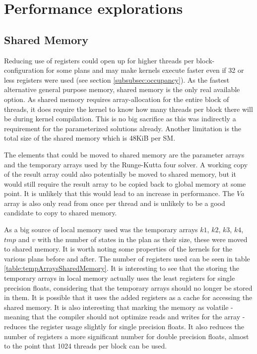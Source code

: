 \section{Performance explorations}
\subsection{Shared Memory}\label{subsec:sharedmem}
Reducing use of registers could open up for higher threads per block-configuration for some plans and may make kernels execute faster even if 32 or less registers were used (see section \ref{subsubsec:occupancy}).
As the fastest alternative general purpose memory, shared memory is the only real available option.
As shared memory requires array-allocation for the entire block of threads, it does require the kernel to know how many threads per block there will be during kernel compilation.
This is no big sacrifice as this was indirectly a requirement for the parameterized solutions already.
Another limitation is the total size of the shared memory which is 48KiB per SM.

The elements that could be moved to shared memory are the parameter arrays and the temporary arrays used by the Runge-Kutta four solver.
A working copy of the result array could also potentially be moved to shared memory, but it would still require the result array to be copied back to global memory at some point.
It is unlikely that this would lead to an increase in performance.
The $Va$ array is also only read from once per thread and is unlikely to be a good candidate to copy to shared memory.

As a big source of local memory used was the temporary arrays $k1$, $k2$, $k3$, $k4$, $tmp$ and $v$ with the number of states in the plan as their size, these were moved to shared memory.
It is worth noting some properties of the kernels for the various plans before and after.
The number of registers used can be seen in table \ref{table:tempArraysSharedMemory}.
It is interesting to see that the storing the temporary arrays in local memory actually uses the least registers for single precision floats, considering that the temporary arrays should no longer be stored in them.
It is possible that it uses the added registers as a cache for accessing the shared memory.
It is also interesting that marking the memory as volatile - meaning that the compiler should not optimize reads and writes for the array - reduces the register usage slightly for single precision floats.
It also reduces the number of registers a more significant number for double precision floats, almost to the point that 1024 threads per block can be used.

